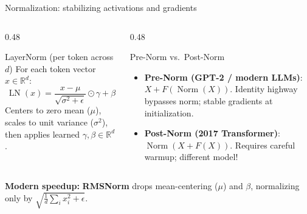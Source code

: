 \documentclass[handout]{beamer}
\begin{document}
\begin{frame}{Normalization: stabilizing activations and gradients}
  \begin{columns}[t]
    \begin{column}{0.48\linewidth}
      \begin{block}{LayerNorm (per token across $d$)}
        For each token vector $x \in \mathbb{R}^d$:
        \[
          \operatorname{LN}(x) = \frac{x - \mu}{\sqrt{\sigma^2 + \epsilon}} \odot \gamma + \beta
        \]
        Centers to zero mean ($\mu$), scales to unit variance ($\sigma^2$), then applies learned $\gamma, \beta \in \mathbb{R}^d$.
      \end{block}
    \end{column}
    \begin{column}{0.48\linewidth}
      \begin{alertblock}{Pre-Norm vs.\ Post-Norm}
        \begin{itemize}
            \setlength{\itemsep}{4pt}
            \footnotesize
          \item \textbf{Pre-Norm (GPT-2 / modern LLMs)}: $X + F(\operatorname{Norm}(X))$. Identity highway bypasses norm; stable gradients at initialization.
          \item \textbf{Post-Norm (2017 Transformer)}: $\operatorname{Norm}(X + F(X))$. Requires careful warmup; different model!
        \end{itemize}
      \end{alertblock}
    \end{column}
  \end{columns}
  \vfill
  \centering\small\textbf{Modern speedup:} \textbf{RMSNorm} drops mean-centering ($\mu$) and $\beta$, normalizing only by $\sqrt{\frac{1}{d}\sum_i x_i^2 + \epsilon}$.
\end{frame}
\end{document}
